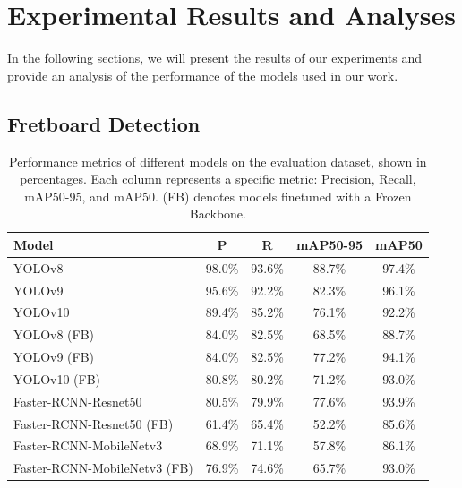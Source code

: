 \documentclass[10pt,twocolumn,letterpaper]{article}
\begin{document}
\section{Experimental Results and Analyses}
\label{sec:results}

In the following sections, we will present the results of our experiments and provide an analysis of the performance of the models used in our work.

\subsection{Fretboard Detection}

\begin{table}[thb]
    \scriptsize
    \centering
    \begin{tabular}{lcccc}
        \toprule
        \textbf{Model}          & \textbf{P} & \textbf{R} & \textbf{mAP50-95} & \textbf{mAP50} \\
        \midrule
        YOLOv8                  & 98.0\%     & 93.6\%     & 88.7\%            & 97.4\%         \\
        YOLOv9                  & 95.6\%     & 92.2\%     & 82.3\%            & 96.1\%         \\
        YOLOv10                 & 89.4\%     & 85.2\%     & 76.1\%            & 92.2\%         \\
        YOLOv8 (FB)             & 84.0\%     & 82.5\%     & 68.5\%            & 88.7\%         \\
        YOLOv9 (FB)             & 84.0\%     & 82.5\%     & 77.2\%            & 94.1\%         \\
        YOLOv10 (FB)            & 80.8\%     & 80.2\%     & 71.2\%            & 93.0\%         \\
        Faster-RCNN-Resnet50         & 80.5\%     & 79.9\%     & 77.6\%            & 93.9\%         \\
        Faster-RCNN-Resnet50 (FB)    & 61.4\%     & 65.4\%     & 52.2\%            & 85.6\%         \\
        Faster-RCNN-MobileNetv3      & 68.9\%     & 71.1\%     & 57.8\%            & 86.1\%         \\
        Faster-RCNN-MobileNetv3 (FB) & 76.9\%     & 74.6\%     & 65.7\%            & 93.0\%         \\
        \bottomrule
    \end{tabular}
    \caption{Performance metrics of different models on the evaluation dataset, shown in percentages. Each column represents a specific metric: Precision, Recall, mAP50-95, and mAP50. (FB) denotes models finetuned with a Frozen Backbone.}
    \label{tab:metrics-results}
\end{table}
\end{document}
